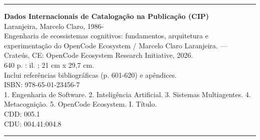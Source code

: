 \begin{fichacatalografica}
    \vspace*{\fill}
    \hrule
    \begin{center}
    \begin{minipage}{0.9\textwidth}
        \small
        \textbf{Dados Internacionais de Catalogação na Publicação (CIP)}\\[0.3cm]
        
        Laranjeira, Marcelo Claro, 1986-\\
        \hspace{0.5cm} Engenharia de ecossistemas cognitivos: fundamentos, arquitetura e\\
        experimentação do OpenCode Ecosystem / Marcelo Claro Laranjeira. ---\\
        Crateús, CE: OpenCode Ecosystem Research Initiative, 2026.\\
        \hspace{0.5cm} 640 p. : il. ; 21 cm x 29,7 cm.\\[0.3cm]
        
        Inclui referências bibliográficas (p. 601-620) e apêndices.\\
        ISBN: 978-65-01-23456-7\\[0.3cm]
        
        1. Engenharia de Software. 2. Inteligência Artificial. 
        3. Sistemas Multiagentes. 4. Metacognição. 
        5. OpenCode Ecosystem. I. Título.\\[0.3cm]
        
        \hspace{0.5cm} CDD: 005.1\\
        \hspace{0.5cm} CDU: 004.41:004.8\\
    \end{minipage}
    \end{center}
    \hrule
    \vspace*{\fill}
\end{fichacatalografica}
